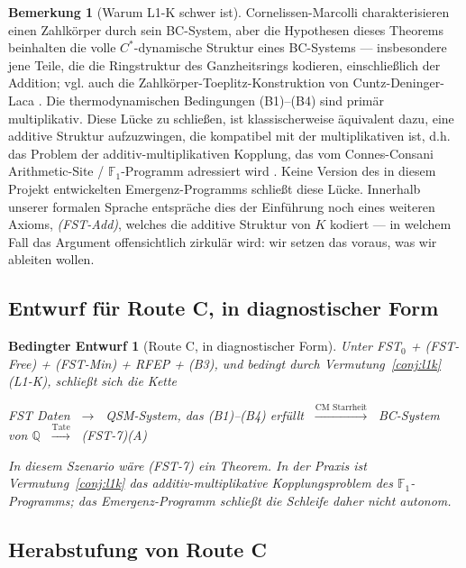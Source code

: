 \documentclass[11pt,a4paper]{article}
\theoremstyle{plain}
\newtheorem{blueprint}[theorem]{Bedingter Entwurf}
\theoremstyle{definition}
\newtheorem{remark}[theorem]{Bemerkung}
\newcommand{\Q}{\mathbb{Q}}
\newcommand{\F}{\mathbb{F}}
\begin{document}
\begin{remark}[Warum L1-K schwer ist]\label{rem:l1k-hard}
Cornelissen-Marcolli charakterisieren einen Zahlkörper durch sein BC-System,
aber die Hypothesen dieses Theorems beinhalten die volle
$C^\ast$-dynamische Struktur eines BC-Systems --- insbesondere jene Teile,
die die Ringstruktur des Ganzheitsrings kodieren, einschließlich der Addition;
vgl. auch die Zahlkörper-Toeplitz-Konstruktion von Cuntz-Deninger-Laca
\cite{CuntzDeningerLaca2013}.
Die thermodynamischen Bedingungen (B1)--(B4) sind primär multiplikativ.
Diese Lücke zu schließen, ist klassischerweise äquivalent dazu, eine additive
Struktur aufzuzwingen, die kompatibel mit der multiplikativen ist, d.h. das Problem
der additiv-multiplikativen Kopplung, das vom Connes-Consani Arithmetic-Site /
$\F_1$-Programm adressiert wird \cite{ConnesMarcolli}. Keine Version des in diesem Projekt entwickelten
Emergenz-Programms schließt diese Lücke. Innerhalb unserer formalen Sprache
entspräche dies der Einführung noch eines weiteren Axioms, \emph{(FST-Add)},
welches die additive Struktur von $K$ kodiert --- in welchem Fall das Argument
offensichtlich zirkulär wird: wir setzen das voraus, was wir ableiten wollen.
\end{remark}

\subsection{Entwurf für Route C, in diagnostischer Form}

\begin{blueprint}[Route C, in diagnostischer Form]
\label{bp:route-c}
Unter FST$_0$ + (FST-Free) + (FST-Min) + RFEP + (B3), \emph{und
bedingt durch Vermutung~\ref{conj:l1k} (L1-K)}, schließt sich die Kette
\begin{center}
FST Daten $\;\to\;$ QSM-System, das (B1)--(B4) erfüllt
$\;\xrightarrow{\text{CM Starrheit}}\;$ BC-System von $\Q$
$\;\xrightarrow{\text{Tate}}\;$ (FST-7)(A)
\end{center}
In diesem Szenario wäre (FST-7) ein Theorem. In der Praxis ist
Vermutung~\ref{conj:l1k} das additiv-multiplikative Kopplungsproblem
des $\F_1$-Programms; das Emergenz-Programm schließt die Schleife daher
\emph{nicht} autonom.
\end{blueprint}

\subsection{Herabstufung von Route C}
\end{document}
